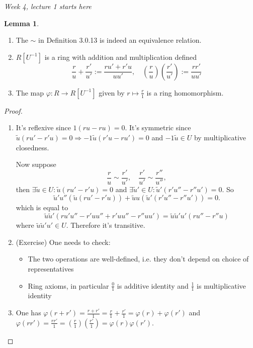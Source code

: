\documentclass[a4paper]{article}
\theoremstyle{definition}
\newtheorem{lemma}[defn]{Lemma}
\begin{document}
\begin{flushright}
\textit{Week 4, lecture 1 starts here}
\end{flushright}

\begin{lemma}
\begin{enumerate}
\item The $\sim$ in Definition 3.0.13 is indeed an equivalence relation.
\item $R[U^{-1}]$ is a ring with addition and multiplication defined
\[
\frac{r}{u}+\frac{r'}{u'}:=\frac{ru'+r'u}{uu'},\quad \left(\frac{r}{u}\right)\left(\frac{r'}{u'}\right):=\frac{rr'}{uu'}
\]
\item The map $\varphi:R\rightarrow R[U^{-1}]$ given by $r\mapsto \frac{r}{1}$ is a ring homomorphism.
\end{enumerate}
\end{lemma}
\begin{proof}
\begin{enumerate}
\item It's reflexive since $1(ru-ru)=0$. It's symmetric since $\tilde u(ru'-r'u)=0\Rightarrow -1\tilde u(r'u-ru')=0$ and $-1\tilde u\in U$ by multiplicative closedness.

Now suppose
\[
\frac{r}{u}\sim\frac{r'}{u'},\quad \frac{r'}{u'}\sim\frac{r''}{u''},
\]
then $\exists \tilde u\in U:\tilde u(ru'-r'u)=0$ and $\exists \tilde u'\in U:\tilde u'(r'u''-r''u')=0$. So
\[
\tilde u' u'' (\tilde u(ru'-r'u))+\tilde u u (\tilde u'(r'u''-r''u'))=0.
\]
which is equal to
\[
\tilde u \tilde u' (ru'u''-r'uu''+r'uu''-r''uu')=\tilde u \tilde u' u' (ru''-r''u)
\]
where $\tilde u \tilde u' u'\in U$. Therefore it's transitive.
\item (Exercise) One needs to check:
\begin{itemize}
\item The two operations are well-defined, i.e. they don't depend on choice of representatives
\item Ring axioms, in particular $\frac01$ is additive identity and $\frac11$ is multiplicative identity
\end{itemize}
\item One has $\varphi (r+r')=\frac{r+r'}{1}=\frac{r}{1}+\frac{r'}{1}=\varphi(r)+\varphi(r')$ and $\varphi(rr')=\frac{rr'}{1}=\left(\frac{r}{1}\right)\left(\frac{r'}{1}\right)=\varphi(r)\varphi(r')$.
\end{enumerate}
\end{proof}
\end{document}
